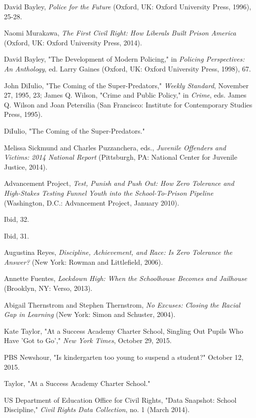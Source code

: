 \documentclass[fontset=fandol, a4paper, 12pt, openright]{ctexbook}
\begin{document}
\begin{enumerate}[label={[\arabic*]}]
    \item David Bayley, \textit{Police for the Future} (Oxford, UK: Oxford University Press, 1996), 25-28.
    \item Naomi Murakawa, \textit{The First Civil Right: How Liberals Built Prison America} (Oxford, UK: Oxford University Press, 2014).
    \item David Bayley, "The Development of Modern Policing," in \textit{Policing Perspectives: An Anthology}, ed. Larry Gaines (Oxford, UK: Oxford University Press, 1998), 67.
    \item John DiIulio, "The Coming of the Super-Predators," \textit{Weekly Standard}, November 27, 1995, 23; James Q. Wilson, "Crime and Public Policy," in \textit{Crime}, eds. James Q. Wilson and Joan Petersilia (San Francisco: Institute for Contemporary Studies Press, 1995).
    \item DiIulio, "The Coming of the Super-Predators."
    \item Melissa Sickmund and Charles Puzzanchera, eds., \textit{Juvenile Offenders and Victims: 2014 National Report} (Pittsburgh, PA: National Center for Juvenile Justice, 2014).
    \item Advancement Project, \textit{Test, Punish and Push Out: How Zero Tolerance and High-Stakes Testing Funnel Youth into the School-To-Prison Pipeline} (Washington, D.C.: Advancement Project, January 2010).
    \item Ibid, 32.
    \item Ibid, 31.
    \item Augustina Reyes, \textit{Discipline, Achievement, and Race: Is Zero Tolerance the Answer?} (New York: Rowman and Littlefield, 2006).
    \item Annette Fuentes, \textit{Lockdown High: When the Schoolhouse Becomes and Jailhouse} (Brooklyn, NY: Verso, 2013).
    \item Abigail Thernstrom and Stephen Thernstrom, \textit{No Excuses: Closing the Racial Gap in Learning} (New York: Simon and Schuster, 2004).
    \item Kate Taylor, "At a Success Academy Charter School, Singling Out Pupils Who Have 'Got to Go'," \textit{New York Times}, October 29, 2015.
    \item PBS Newshour, "Is kindergarten too young to suspend a student?" October 12, 2015.
    \item Taylor, "At a Success Academy Charter School."
    \item US Department of Education Office for Civil Rights, "Data Snapshot: School Discipline," \textit{Civil Rights Data Collection}, no. 1 (March 2014).

\end{enumerate}
\end{document}
